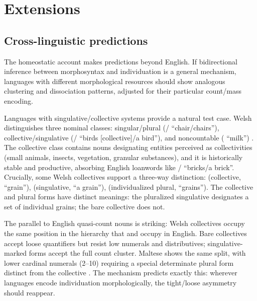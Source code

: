\documentclass[12pt,a4paper]{article}
\begin{document}
\section{Extensions}\label{sec:extensions}

\subsection{Cross-linguistic predictions}\label{sec:crossling}

The homeostatic account makes predictions beyond English. If bidirectional inference between morphosyntax and individuation is a general mechanism, languages with different morphological resources should show analogous clustering and dissociation patterns, adjusted for their particular count/mass encoding.

Languages with singulative/collective systems provide a natural test case. Welsh distinguishes three nominal classes: singular/plural (/ \enquote{chair/chairs}), collective/singulative (/ \enquote{birds [collective]/a bird}), and noncountable ( \enquote{milk}) \citep[pp.~530--535]{grimm2018}. The collective class contains nouns designating entities perceived as collectivities (small animals, insects, vegetation, granular substances), and it is historically stable and productive, absorbing English loanwords like / \enquote{bricks/a brick}. Crucially, some Welsh collectives support a three-way distinction:  (collective, \enquote{grain}),  (singulative, \enquote{a grain}),  (individualized plural, \enquote{grains}). The collective and plural forms have distinct meanings: the pluralized singulative designates a set of individual grains; the bare collective does not.

The parallel to English quasi-count nouns is striking: Welsh collectives occupy the same position in the hierarchy that  and  occupy in English. Bare collectives accept loose quantifiers but resist low numerals and distributives; singulative-marked forms accept the full count cluster. Maltese shows the same split, with lower cardinal numerals (2--10) requiring a special determinate plural form distinct from the collective \citep[p.~543]{grimm2018}. The mechanism predicts exactly this: wherever languages encode individuation morphologically, the tight/loose asymmetry should reappear.
\end{document}
